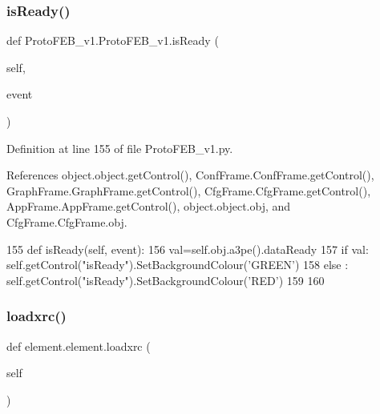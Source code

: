 \subsubsection{\texorpdfstring{is\+Ready()}{isReady()}}
{\footnotesize\ttfamily def Proto\+F\+E\+B\+\_\+v1.\+Proto\+F\+E\+B\+\_\+v1.\+is\+Ready (\begin{DoxyParamCaption}\item[{}]{self,  }\item[{}]{event }\end{DoxyParamCaption})}



Definition at line 155 of file Proto\+F\+E\+B\+\_\+v1.\+py.



References object.\+object.\+get\+Control(), Conf\+Frame.\+Conf\+Frame.\+get\+Control(), Graph\+Frame.\+Graph\+Frame.\+get\+Control(), Cfg\+Frame.\+Cfg\+Frame.\+get\+Control(), App\+Frame.\+App\+Frame.\+get\+Control(), object.\+object.\+obj, and Cfg\+Frame.\+Cfg\+Frame.\+obj.


\begin{DoxyCode}
155     \textcolor{keyword}{def }isReady(self, event):
156         val=self.obj.a3pe().dataReady
157         \textcolor{keywordflow}{if} val: self.getControl(\textcolor{stringliteral}{"isReady"}).SetBackgroundColour(\textcolor{stringliteral}{'GREEN'})
158         \textcolor{keywordflow}{else} : self.getControl(\textcolor{stringliteral}{"isReady"}).SetBackgroundColour(\textcolor{stringliteral}{'RED'})
159 
160 
\end{DoxyCode}
\mbox{\label{classelement_1_1element_aa9fadd76b299e1dfddd1da112dfe8245}} 
\subsubsection{\texorpdfstring{loadxrc()}{loadxrc()}}
{\footnotesize\ttfamily def element.\+element.\+loadxrc (\begin{DoxyParamCaption}\item[{}]{self }\end{DoxyParamCaption})\hspace{0.3cm}{\ttfamily [inherited]}}




